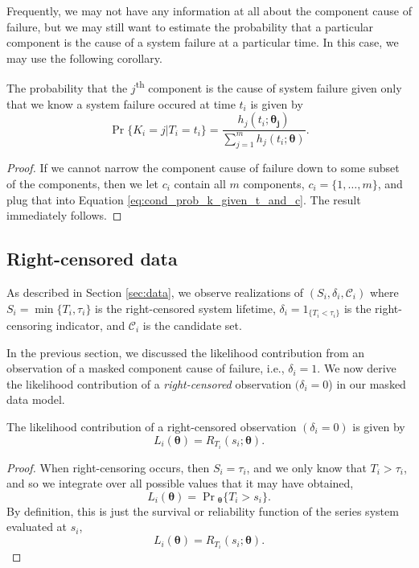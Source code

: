 \documentclass[
]{article}
\begin{document}
Frequently, we may not have any information at all about the component
cause of failure, but we may still want to estimate the probability that
a particular component is the cause of a system failure at a particular
time. In this case, we may use the following corollary.

\begin{corollary}
The probability that the $j$\textsuperscript{th}
component is the cause of system failure given only that we know a system failure
occured at time $t_i$ is given by
$$
\Pr\{K_i = j|T_i=t_i\} = \frac{h_j(t_i;\boldsymbol{\theta_j})}{\sum_{j=1}^m h_j(t_i;\boldsymbol{\theta})}.
$$
\end{corollary}
\begin{proof}
If we cannot narrow the component cause of failure down to some subset of the
components, then we let $c_i$ contain all $m$ components, $c_i = \{1,\ldots,m\}$, and
plug that into Equation \ref{eq:cond_prob_k_given_t_and_c}. The result immediately
follows.
\end{proof}

\hypertarget{right-censored-data}{%
\subsection{Right-censored data}\label{right-censored-data}}

As described in Section \ref{sec:data}, we observe realizations of
\((S_i,\delta_i,\mathcal{C}_i)\) where \(S_i = \min\{T_i,\tau_i\}\) is
the right-censored system lifetime, \(\delta_i = 1_{\{T_i < \tau_i\}}\)
is the right-censoring indicator, and \(\mathcal{C}_i\) is the candidate
set.

In the previous section, we discussed the likelihood contribution from
an observation of a masked component cause of failure, i.e.,
\(\delta_i = 1\). We now derive the likelihood contribution of a
\emph{right-censored} observation \((\delta_i = 0\)) in our masked data
model.

\begin{theorem}
\label{thm:joint_s_d_c}
The likelihood contribution of a right-censored observation $(\delta_i = 0)$
is given by
\begin{equation}
L_i(\boldsymbol{\theta}) = R_{T_i}(s_i;\boldsymbol{\theta}).
\end{equation}
\end{theorem}
\begin{proof}
When right-censoring occurs, then $S_i = \tau_i$, and we only know that
$T_i > \tau_i$, and so we integrate over all possible values that it may have
obtained,
$$
L_i(\boldsymbol{\theta}) = \Pr\!{}_{\boldsymbol{\theta}}\{T_i > s_i\}.
$$
By definition, this is just the survival or reliability function of the series system
evaluated at $s_i$,
$$
L_i(\boldsymbol{\theta}) = R_{T_i}(s_i;\boldsymbol{\theta}).
$$
\end{proof}
\end{document}

